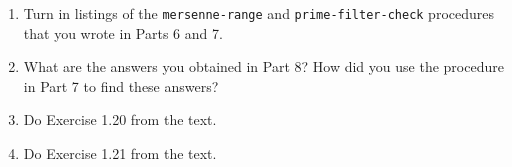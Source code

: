 \begin{enumerate}
\item Turn in listings of the {\tt mersenne-range} and
{\tt prime-filter-check} procedures that you wrote in Parts 6 and 7.

\item What are the answers you obtained in Part 8?  How did you use the
procedure in Part 7 to find these answers?

\item Do Exercise 1.20 from the text.

\item Do Exercise 1.21 from the text.
\end{enumerate}


